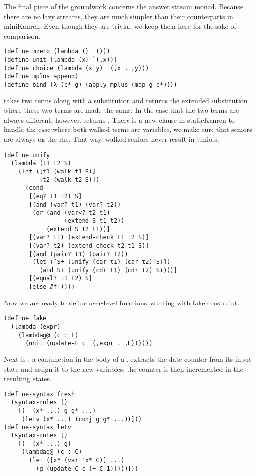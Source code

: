 The final piece of the groundwork concerns the answer stream monad. Because there are no lazy streams, they are much simpler than their counterparts in miniKanren. Even though they are trivial, we keep them here for the sake of comparison.
\begin{lstlisting}
(define mzero (lambda () '()))
(define unit (lambda (x) `(,x)))
(define choice (lambda (x y) `(,x . ,y)))
(define mplus append)
(define bind (λ (c* g) (apply mplus (map g c*))))
\end{lstlisting}

 takes two terms along with a substitution and returns the extended substitution where these two terms are made the same. In the case that the two terms are always different, however,  returns . There is a new clause in staticKanren to handle the case where both walked terms are variables, we make sure that seniors are always on the rhs. That way, walked seniors never result in juniors.
\begin{lstlisting}
(define unify
  (lambda (t1 t2 S)
    (let ([t1 (walk t1 S)]
          [t2 (walk t2 S)])
      (cond
       [(eq? t1 t2) S]
       [(and (var? t1) (var? t2))
        (or (and (var<? t2 t1)
                 (extend S t1 t2))
            (extend S t2 t1))]
       [(var? t1) (extend-check t1 t2 S)]
       [(var? t2) (extend-check t2 t1 S)]
       [(and (pair? t1) (pair? t2))
        (let ([S+ (unify (car t1) (car t2) S)])
          (and S+ (unify (cdr t1) (cdr t2) S+)))]
       [(equal? t1 t2) S]
       [else #f]))))
\end{lstlisting}

Now we are ready to define user-level functions, starting with fake constraint.
\begin{lstlisting}
(define fake
  (lambda (expr)
    (lambdag@ (c : F)
      (unit (update-F c `(,expr . ,F))))))
\end{lstlisting}

Next is , a conjunction in the body of a .  extracts the date counter from its input state and assign it to the new variables; the counter is then incremented in the resulting states.
\begin{lstlisting}
(define-syntax fresh
  (syntax-rules ()
    [(_ (x* ...) g g* ...)
     (letv (x* ...) (conj g g* ...))]))
(define-syntax letv
  (syntax-rules ()
    [(_ (x* ...) g)
     (lambdag@ (c : C)
       (let ([x* (var 'x* C)] ...)
         (g (update-C c (+ C 1)))))]))
\end{lstlisting}

